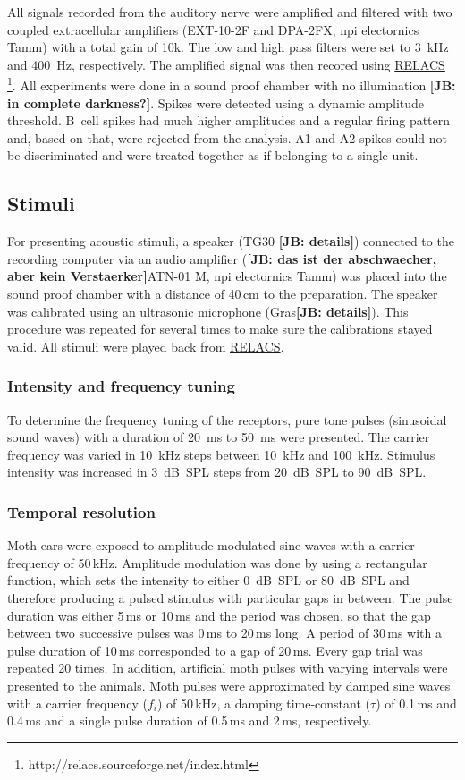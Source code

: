 \documentclass[12pt,a4paper]{article}
\newcommand{\relacs}[1]{\href{http://www.relacs.net}{#1}}
\newcommand{\note}[2][]{\textbf{[#1: #2]}}
\newcommand{\notejb}[1]{\note[JB]{#1}}
\begin{document}
All signals recorded from the auditory nerve were amplified and filtered with two coupled extracellular amplifiers (EXT-10-2F and DPA-2FX, npi electornics Tamm) with a total gain of 10k. The low and high pass filters were set to 3~kHz and 400~Hz, respectively. The amplified signal was then recored using \relacs{RELACS} \footnote{http://relacs.sourceforge.net/index.html}. All experiments were done in a sound proof chamber with no illumination \notejb{in complete darkness?}. Spikes were detected using a dynamic amplitude threshold. B~cell spikes had much higher amplitudes and a regular firing pattern and, based on that, were rejected from the analysis. A1 and A2 spikes could not be discriminated and were treated together as if belonging to a single unit. 


\subsection{Stimuli}
For presenting acoustic stimuli, a speaker (TG30 \notejb{details}) connected to the recording computer via an audio amplifier (\notejb{das ist der abschwaecher, aber kein Verstaerker}ATN-01 M, npi electornics Tamm) was placed into the sound proof chamber with a distance of 40\,cm to the preparation. The speaker was calibrated using an ultrasonic microphone (Gras\notejb{details}). This procedure was repeated for several times to make sure the calibrations stayed valid. All stimuli were played back from \relacs{RELACS}.

\subsubsection{Intensity and frequency tuning}
To determine the frequency tuning of the receptors, pure tone pulses (sinusoidal sound waves) with a duration of 20~ms to 50~ms were presented. The carrier frequency was varied in 10~kHz steps between 10~kHz and 100~kHz. Stimulus intensity was increased in 3~dB~SPL steps from 20~dB~SPL to 90~dB~SPL.

\subsubsection{Temporal resolution}
Moth ears were exposed to amplitude modulated sine waves with a carrier frequency of 50\,kHz. Amplitude modulation was done by using a rectangular function, which sets the intensity to either 0~dB~SPL or 80~dB~SPL and therefore producing a pulsed stimulus with particular gaps in between. The pulse duration was either 5\,ms or 10\,ms and the period was chosen, so that the gap between two successive pulses was 0\,ms to 20\,ms long. A period of 30\,ms with a pulse duration of 10\,ms corresponded to a gap of 20\,ms. Every gap trial was repeated 20 times. In addition, artificial moth pulses with varying intervals were presented to the animals. Moth pulses were approximated by damped sine waves with a carrier frequency ($f_{i}$) of 50\,kHz, a damping time-constant ($\tau$) of 0.1\,ms and 0.4\,ms and a single pulse duration of 0.5\,ms and 2\,ms, respectively.
\end{document}
